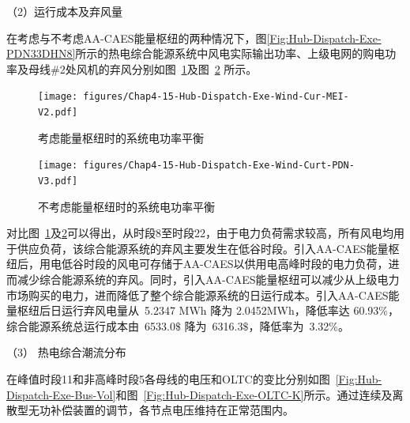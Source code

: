 （2）运行成本及弃风量

在考虑与不考虑AA-CAES能量枢纽的两种情况下，图\ref{Fig:Hub-Dispatch-Exe-PDN33DHN8}所示的热电综合能源系统中风电实际输出功率、上级电网的购电功率及母线\#2处风机的弃风分别如图~\ref{Fig:Hub-Dispatch-Exe-Wind-Cur-MEI}及图~\ref{Fig:Hub-Dispatch-Exe-Wind-Curt-PDN} 所示。

\begin{figure}[H]
\centering
\texttt{[image: figures/Chap4-15-Hub-Dispatch-Exe-Wind-Cur-MEI-V2.pdf]}
\caption{考虑能量枢纽时的系统电功率平衡}
\label{Fig:Hub-Dispatch-Exe-Wind-Cur-MEI}
\end{figure}

\begin{figure}[H]
\centering
\texttt{[image: figures/Chap4-15-Hub-Dispatch-Exe-Wind-Curt-PDN-V3.pdf]}
\caption{不考虑能量枢纽时的系统电功率平衡}
\label{Fig:Hub-Dispatch-Exe-Wind-Curt-PDN}
\end{figure}

对比图~\ref{Fig:Hub-Dispatch-Exe-Wind-Cur-MEI}及\ref{Fig:Hub-Dispatch-Exe-Wind-Curt-PDN}可以得出，从时段8至时段22，由于电力负荷需求较高，所有风电均用于供应负荷，该综合能源系统的弃风主要发生在低谷时段。引入AA-CAES能量枢纽后，用电低谷时段的风电可存储于AA-CAES以供用电高峰时段的电力负荷，进而减少综合能源系统的弃风。同时，引入AA-CAES能量枢纽可以减少从上级电力市场购买的电力，进而降低了整个综合能源系统的日运行成本。引入AA-CAES能量枢纽后日运行弃风电量从~5.2347 MWh 降为 2.0452MWh，降低率达 60.93\%，综合能源系统总运行成本由~6533.0$\$$ 降为~6316.3$\$$，降低率为~3.32\%。

（3） 热电综合潮流分布

在峰值时段11和非高峰时段5各母线的电压和OLTC的变比分别如图~\ref{Fig:Hub-Dispatch-Exe-Bus-Vol}和图~\ref{Fig:Hub-Dispatch-Exe-OLTC-K}所示。通过连续及离散型无功补偿装置的调节，各节点电压维持在正常范围内。

